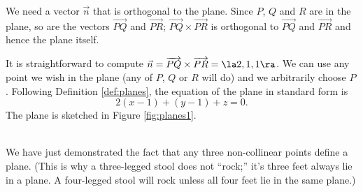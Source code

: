 {We need a vector $\vec n$ that is orthogonal to the plane. Since $P$, $Q$ and $R$ are in the plane, so are the vectors $\overrightarrow{PQ}$ and $\overrightarrow{PR}$; $\overrightarrow{PQ}\times\overrightarrow{PR}$ is orthogonal to $\overrightarrow{PQ}$ and $\overrightarrow{PR}$ and hence the plane itself.

It is straightforward to compute $\vec n = \overrightarrow{PQ}\times\overrightarrow{PR} = \la 2,1,1\ra$. We can use any point we wish in the plane (any of $P$, $Q$ or $R$ will do) and we arbitrarily choose $P$. Following Definition \ref{def:planes}, the equation of the plane in standard form is 
\[
2(x-1) + (y-1)+z = 0.
\]
The plane is sketched in Figure \ref{fig:planes1}.
}\\

We have just demonstrated the fact that any three non-collinear points define a plane. (This is why a three-legged stool does not ``rock;'' it's three feet always lie in a plane. A four-legged stool will rock unless all four feet lie in the same plane.)\\


